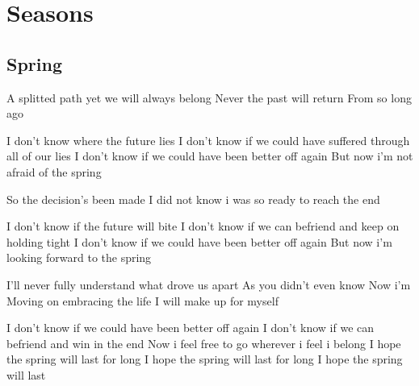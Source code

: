 \documentclass{article}
\newenvironment{album}[1]%
{%
  \section*{#1}
}%
{%
}
\newenvironment{song}[1]%
{%
  \subsection*{\textbf{#1}}
  \begin{multicols*}{2}
}%
{%
  \end{multicols*}
  \newpage
}
\newenvironment{couplet} %
{%
  \verbatim
}%
{% end code
  \endverbatim
}
\newenvironment{refrain} %
{%
  \verbatim
}%
{% end code
  \endverbatim
}
\begin{document}
\begin{album}{Seasons}
\begin{song}{Spring}
\begin{couplet}
A splitted path yet we will always belong
Never the past will return
From so long ago
\end{couplet}

\begin{refrain}
I don't know where the future lies
I don't know if we could have suffered through all of our lies
I don't know if we could have been better off again
But now i'm not afraid of the spring
\end{refrain}

\begin{couplet}
So the decision's been made
I did not know i was so ready to reach the end
\end{couplet}

\begin{refrain}
I don't know if the future will bite
I don't know if we can befriend and keep on holding tight
I don't know if we could have been better off again
But now i'm looking forward to the spring
\end{refrain}

\begin{couplet}
I'll never fully understand what drove us apart
As you didn't even know
Now i'm Moving on embracing the life I will make up for myself
\end{couplet}

\begin{refrain}
I don't know if we could have been better off again
I don't know if we can befriend and win in the end
Now i feel free to go wherever i feel i belong
I hope the spring will last for long
I hope the spring will last for long
I hope the spring will last
\end{refrain}

\end{song}

\end{album}
\end{document}
